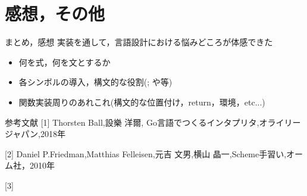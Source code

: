 \documentclass[uplatex,dvipdfmx,ja=standard]{beamer}
\begin{document}
\section{感想，その他}

\begin{frame}{まとめ，感想}
実装を通して，言語設計における悩みどころが体感できた
    \begin{itemize}
        \item 何を式，何を文とするか
        \item 各シンボルの導入，構文的な役割(; や{}等)
        \item 関数実装周りのあれこれ(構文的な位置付け，return，環境，etc...)
    \end{itemize}
\end{frame}


\begin{frame}{参考文献}
    [1] Thorsten Ball,設樂 洋爾, Go言語でつくるインタプリタ,オライリージャパン,2018年

    [2] Daniel P.Friedman,Matthias Felleisen,元吉 文男,横山 晶一,Scheme手習い,オーム社，2010年
    
    [3]
\end{frame}

%
\end{document}
